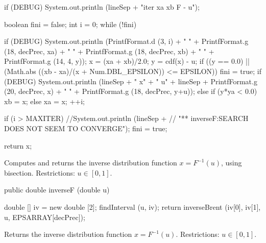 \begin{code}
\begin{hide}
{      if (DEBUG)
          System.out.println (lineSep +
             "iter              xa                   xb           F - u");

      boolean fini = false;
      int i = 0;
      while (!fini) {
          if (DEBUG)
             System.out.println (PrintfFormat.d (3, i) + "  " +
                                 PrintfFormat.g (18, decPrec, xa) + "  " +
                                 PrintfFormat.g (18, decPrec, xb) + "  " +
                                 PrintfFormat.g (14, 4, y));
          x = (xa + xb)/2.0;
          y = cdf(x) - u;
          if ((y == 0.0) ||
              (Math.abs ((xb - xa)/(x + Num.DBL_EPSILON)) <= EPSILON))  {
              fini = true;
              if (DEBUG)
                System.out.println (lineSep + "                x" +
                     "                     u" + lineSep +
                     PrintfFormat.g (20, decPrec, x) + "  " +
                     PrintfFormat.g (18, decPrec, y+u));
          }
          else if (y*ya < 0.0)
             xb = x;
          else
             xa = x;
          ++i;

          if (i > MAXITER) {
                //System.out.println (lineSep +
                //  "** inverseF:SEARCH DOES NOT SEEM TO CONVERGE");
              fini = true;
          }
      }
      return x;
   }\end{hide}
\end{code}
\begin{tabb}
    Computes and returns the inverse distribution function $x = F^{-1}(u)$,
    using bisection. Restrictions: $u \in [0,1]$.
\end{tabb}
\begin{htmlonly}
\end{htmlonly}
\begin{code}

   public double inverseF (double u)\begin{hide} {
      double [] iv = new double [2];
      findInterval (u, iv);
      return inverseBrent (iv[0], iv[1], u, EPSARRAY[decPrec]);
   }\end{hide}
\end{code}
\begin{tabb}
    Returns the inverse distribution function $x = F^{-1}(u)$.
    Restrictions: $u \in [0,1]$.
\end{tabb}
